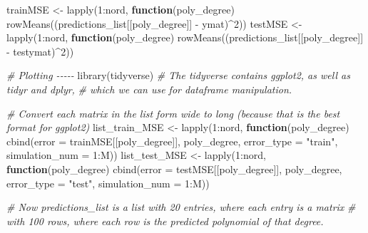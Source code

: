 \documentclass[
]{article}
\newenvironment{Shaded}{\begin{snugshade}}{\end{snugshade}}
\newcommand{\AttributeTok}[1]{\textcolor[rgb]{0.77,0.63,0.00}{#1}}
\newcommand{\CommentTok}[1]{\textcolor[rgb]{0.56,0.35,0.01}{\textit{#1}}}
\newcommand{\ControlFlowTok}[1]{\textcolor[rgb]{0.13,0.29,0.53}{\textbf{#1}}}
\newcommand{\DecValTok}[1]{\textcolor[rgb]{0.00,0.00,0.81}{#1}}
\newcommand{\FunctionTok}[1]{\textcolor[rgb]{0.00,0.00,0.00}{#1}}
\newcommand{\NormalTok}[1]{#1}
\newcommand{\OtherTok}[1]{\textcolor[rgb]{0.56,0.35,0.01}{#1}}
\newcommand{\SpecialCharTok}[1]{\textcolor[rgb]{0.00,0.00,0.00}{#1}}
\newcommand{\StringTok}[1]{\textcolor[rgb]{0.31,0.60,0.02}{#1}}
\begin{document}
\begin{Shaded}
\begin{Highlighting}[]
\NormalTok{trainMSE }\OtherTok{\textless{}{-}} \FunctionTok{lapply}\NormalTok{(}\DecValTok{1}\SpecialCharTok{:}\NormalTok{nord, }\ControlFlowTok{function}\NormalTok{(poly\_degree) }\FunctionTok{rowMeans}\NormalTok{((predictions\_list[[poly\_degree]] }\SpecialCharTok{{-}}\NormalTok{ ymat)}\SpecialCharTok{\^{}}\DecValTok{2}\NormalTok{))}
\NormalTok{testMSE }\OtherTok{\textless{}{-}} \FunctionTok{lapply}\NormalTok{(}\DecValTok{1}\SpecialCharTok{:}\NormalTok{nord, }\ControlFlowTok{function}\NormalTok{(poly\_degree) }\FunctionTok{rowMeans}\NormalTok{((predictions\_list[[poly\_degree]] }\SpecialCharTok{{-}}\NormalTok{ testymat)}\SpecialCharTok{\^{}}\DecValTok{2}\NormalTok{))}

\CommentTok{\# Plotting {-}{-}{-}{-}{-}}
\FunctionTok{library}\NormalTok{(tidyverse) }\CommentTok{\# The tidyverse contains ggplot2, as well as tidyr and dplyr, }
\CommentTok{\# which we can use for dataframe manipulation.}

\CommentTok{\# Convert each matrix in the list form wide to long (because that is the best format for ggplot2)}
\NormalTok{list\_train\_MSE }\OtherTok{\textless{}{-}} \FunctionTok{lapply}\NormalTok{(}\DecValTok{1}\SpecialCharTok{:}\NormalTok{nord, }\ControlFlowTok{function}\NormalTok{(poly\_degree) }\FunctionTok{cbind}\NormalTok{(}\AttributeTok{error =}\NormalTok{ trainMSE[[poly\_degree]], }
\NormalTok{                                                             poly\_degree, }
                                                             \AttributeTok{error\_type =} \StringTok{"train"}\NormalTok{,}
                                                             \AttributeTok{simulation\_num =} \DecValTok{1}\SpecialCharTok{:}\NormalTok{M))}
\NormalTok{list\_test\_MSE }\OtherTok{\textless{}{-}} \FunctionTok{lapply}\NormalTok{(}\DecValTok{1}\SpecialCharTok{:}\NormalTok{nord, }\ControlFlowTok{function}\NormalTok{(poly\_degree) }\FunctionTok{cbind}\NormalTok{(}\AttributeTok{error =}\NormalTok{ testMSE[[poly\_degree]], }
\NormalTok{                                                            poly\_degree, }
                                                            \AttributeTok{error\_type =} \StringTok{"test"}\NormalTok{, }
                                                            \AttributeTok{simulation\_num =} \DecValTok{1}\SpecialCharTok{:}\NormalTok{M))}

\CommentTok{\# Now predictions\_list is a list with 20 entries, where each entry is a matrix }
\CommentTok{\# with 100 rows, where each row is the predicted polynomial of that degree.}


\end{Highlighting}
\end{Shaded}
\end{document}
